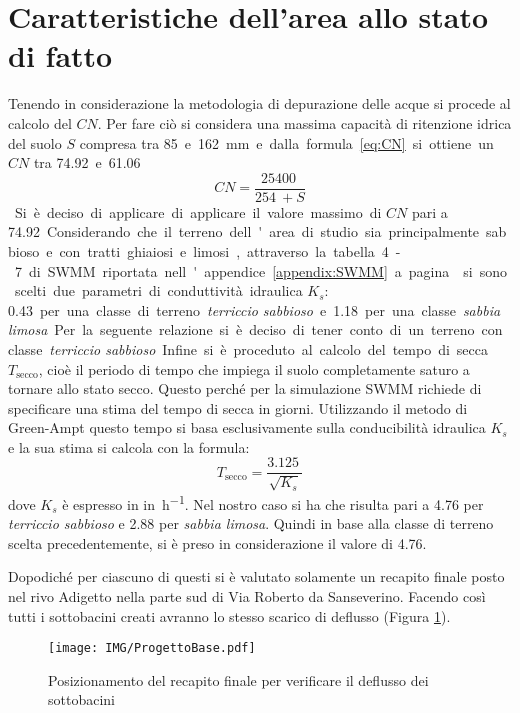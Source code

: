 \section{Caratteristiche dell’area allo stato di fatto}
Tenendo in considerazione la metodologia di depurazione delle acque si procede al calcolo del $CN$. 
Per fare ciò si considera una massima capacità di ritenzione idrica del suolo $S$ compresa tra \SI{85} e \SI{162}{\milli\metre} e dalla formula \ref{eq:CN} si ottiene un $CN$ tra \SI{74.92} e \SI{61.06}.
\begin{equation}
\label{eq:CN}
    CN = \frac{\SI{25400}{}}{\SI{254}{} + S}
\end{equation}
Si è deciso di applicare di applicare il valore massimo di $CN$ pari a \SI{74.92} .

Considerando che il terreno dell'area di studio sia principalmente sabbioso e con tratti ghiaiosi e limosi, attraverso la tabella 4-7 di SWMM riportata nell'appendice \ref{appendix:SWMM} a pagina \pageref{SWMM:tabella4-7} si sono scelti due parametri di conduttività idraulica $K_s$: \SI{0.43} per una classe di terreno \emph{terriccio sabbioso} e \SI{1.18} per una classe \emph{sabbia limosa}. 
Per la seguente relazione si è deciso di tener conto di un terreno con classe \emph{terriccio sabbioso}.

Infine si è proceduto al calcolo del tempo di secca $T_{\text{secco}}$, cioè il periodo di tempo che impiega il suolo completamente saturo a tornare allo stato secco.
Questo perché per la simulazione SWMM richiede di specificare una stima del tempo di secca in giorni.
Utilizzando il metodo di Green-Ampt questo tempo si basa esclusivamente sulla conducibilità idraulica $K_s$ e la sua stima si calcola con la formula: 
\begin{equation}
    T_{\text{secco}} = \frac{\SI{3.125}{}}{\sqrt{K_s}}
\end{equation}
dove $K_s$ è espresso in \si{in\per\hour}.
Nel nostro caso si ha che risulta pari a \SI{4.76}{\days} per \emph{terriccio sabbioso} e \SI{2.88}{\days} per \emph{sabbia limosa}. 
Quindi in base alla classe di terreno scelta precedentemente, si è preso in considerazione il valore di \SI{4.76}{\days}.

Dopodiché per ciascuno di questi si è valutato solamente un recapito finale posto nel rivo Adigetto nella parte sud di Via Roberto da Sanseverino. 
Facendo così tutti i sottobacini creati avranno lo stesso scarico di deflusso (Figura \ref{fig:ProgettoBase}).
\begin{figure}[p]
    \centering
    \texttt{[image: IMG/ProgettoBase.pdf]} 
    \caption{Posizionamento del recapito finale per verificare il deflusso dei sottobacini}
    \label{fig:ProgettoBase}
\end{figure}

